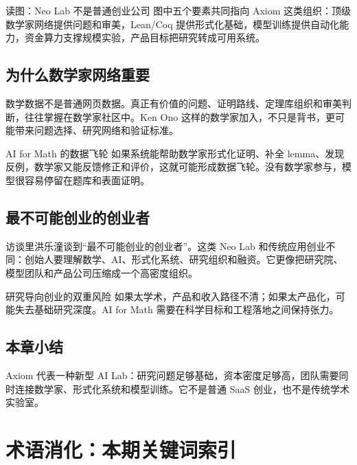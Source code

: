 \documentclass[a4paper]{article}
\begin{document}
\begin{knowledgebox}{读图：Neo Lab 不是普通创业公司}
图中五个要素共同指向 Axiom 这类组织：顶级数学家网络提供问题和审美，Lean/Coq 提供形式化基础，模型训练提供自动化能力，资金算力支撑规模实验，产品目标把研究转成可用系统。
\end{knowledgebox}

\subsection{为什么数学家网络重要}

数学数据不是普通网页数据。真正有价值的问题、证明路线、定理库组织和审美判断，往往掌握在数学家社区中。Ken Ono 这样的数学家加入，不只是背书，更可能带来问题选择、研究网络和验证标准。

\begin{importantbox}{AI for Math 的数据飞轮}
如果系统能帮助数学家形式化证明、补全 lemma、发现反例，数学家又能反馈修正和评价，这就可能形成数据飞轮。没有数学家参与，模型很容易停留在题库和表面证明。
\end{importantbox}

\subsection{最不可能创业的创业者}

访谈里洪乐潼谈到“最不可能创业的创业者”。这类 Neo Lab 和传统应用创业不同：创始人要理解数学、AI、形式化系统、研究组织和融资。它更像把研究院、模型团队和产品公司压缩成一个高密度组织。

\begin{warningbox}{研究导向创业的双重风险}
如果太学术，产品和收入路径不清；如果太产品化，可能失去基础研究深度。AI for Math 需要在科学目标和工程落地之间保持张力。
\end{warningbox}

\subsection{本章小结}

Axiom 代表一种新型 AI Lab：研究问题足够基础，资本密度足够高，团队需要同时连接数学家、形式化系统和模型训练。它不是普通 SaaS 创业，也不是传统学术实验室。

\section{术语消化：本期关键词索引}
\end{document}
